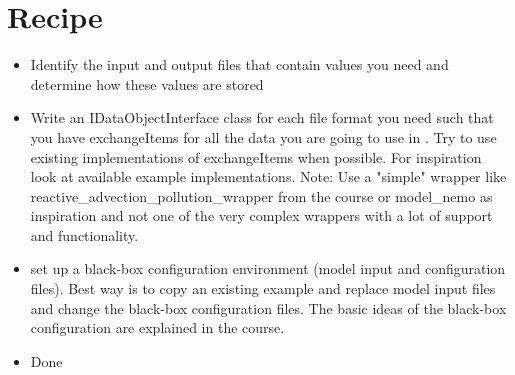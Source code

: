 \section{Recipe}
\begin{itemize}
\item Identify the input and output files that contain values you need and
  determine how these values are stored
\item Write an IDataObjectInterface class for each file format you need such that
  you have exchangeItems for all the data you are going to use in \oda. Try to
  use existing implementations of exchangeItems when possible. For inspiration
  look at available example implementations. Note: Use a "simple" wrapper like
  reactive\_advection\_pollution\_wrapper from the \oda course or model\_nemo
  as inspiration and not one of the very complex wrappers with a lot of support
  and functionality.
\item set up a black-box configuration environment (model input and
  configuration files). Best way is to copy an existing example and replace
  model input files and change the black-box configuration files. The basic
  ideas of the black-box configuration are explained in the \oda course.
\item Done
\end{itemize}





